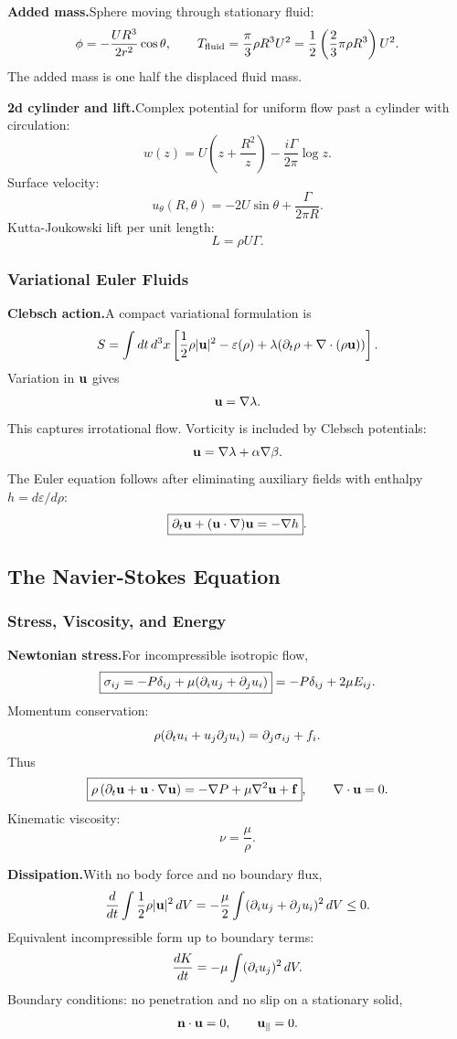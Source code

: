 \noindent\textbf{Added mass.}\quad Sphere moving through stationary fluid:
\[
  \phi=-\frac{UR^3}{2r^2}\cos\theta,
  \qquad
  T_{\rm fluid}=\frac{\pi}{3}\rho R^3U^2
  =\frac{1}{2}\left(\frac23\pi\rho R^3\right)U^2.
\]
The added mass is one half the displaced fluid mass.

\noindent\textbf{2d cylinder and lift.}\quad Complex potential for uniform flow past a cylinder with circulation:
\[
  w(z)=U\left(z+\frac{R^2}{z}\right)-\frac{i\Gamma}{2\pi}\log z.
\]
Surface velocity:
\[
  u_\theta(R,\theta)=-2U\sin\theta+\frac{\Gamma}{2\pi R}.
\]
Kutta-Joukowski lift per unit length:
\[
  \boxed{L=\rho U\Gamma}.
\]

\subsubsection*{Variational Euler Fluids}

\noindent\textbf{Clebsch action.}\quad A compact variational formulation is
\[
  S=\int dt\,d^3x\left[
  \frac{1}{2}\rho|\mathbf{u}|^2-\varepsilon(\rho)
  +\lambda(\partial_t\rho+\nabla\cdot(\rho\mathbf{u}))
  \right].
\]
Variation in $\mathbf{u}$ gives
\[
  \mathbf{u}=\nabla\lambda.
\]
This captures irrotational flow. Vorticity is included by Clebsch potentials:
\[
  \mathbf{u}=\nabla\lambda+\alpha\nabla\beta.
\]
The Euler equation follows after eliminating auxiliary fields with enthalpy $h=d\varepsilon/d\rho$:
\[
  \boxed{\partial_t\mathbf{u}+(\mathbf{u}\cdot\nabla)\mathbf{u}=-\nabla h}.
\]

\subsection{The Navier-Stokes Equation}

\subsubsection*{Stress, Viscosity, and Energy}

\noindent\textbf{Newtonian stress.}\quad For incompressible isotropic flow,
\[
  \boxed{\sigma_{ij}=-P\delta_{ij}+\mu(\partial_i u_j+\partial_j u_i)}
  =-P\delta_{ij}+2\mu E_{ij}.
\]
Momentum conservation:
\[
  \rho(\partial_tu_i+u_j\partial_ju_i)=\partial_j\sigma_{ij}+f_i.
\]
Thus
\[
  \boxed{\rho\left(\partial_t\mathbf{u}+\mathbf{u}\cdot\nabla\mathbf{u}\right)
  =-\nabla P+\mu\nabla^2\mathbf{u}+\mathbf{f}},
  \qquad
  \nabla\cdot\mathbf{u}=0.
\]
Kinematic viscosity:
\[
  \nu=\frac{\mu}{\rho}.
\]

\noindent\textbf{Dissipation.}\quad With no body force and no boundary flux,
\[
  \frac{d}{dt}\int \frac{1}{2}\rho|\mathbf{u}|^2\,dV
  =-\frac{\mu}{2}\int(\partial_i u_j+\partial_j u_i)^2\,dV\le0.
\]
Equivalent incompressible form up to boundary terms:
\[
  \frac{dK}{dt}=-\mu\int(\partial_i u_j)^2\,dV.
\]
Boundary conditions: no penetration and no slip on a stationary solid,
\[
  \mathbf n\cdot\mathbf{u}=0,\qquad \mathbf{u}_\parallel=0.
\]


